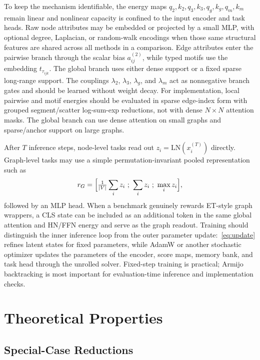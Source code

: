 \documentclass[11pt,a4paper]{article}
\begin{document}
To keep the mechanism identifiable, the energy maps
$q_2,k_2,q_3,k_3,q_g,k_g,q_m,k_m$ remain linear and nonlinear capacity is
confined to the input encoder and task heads. Raw node attributes may be embedded or
projected by a small MLP, with optional degree, Laplacian, or random-walk
encodings when those same structural features are shared across all methods in
a comparison. Edge attributes enter the pairwise branch through the scalar
bias $a^{(2)}_{ij}$, while typed motifs use the embedding $t_{\tau_{ijk}}$.
The global branch uses either dense support or a fixed sparse long-range
support. The couplings $\lambda_2$, $\lambda_3$, $\lambda_g$, and $\lambda_m$
act as nonnegative branch gates and should be learned without weight decay.
For implementation, local pairwise and motif energies should be evaluated in
sparse edge-index form with grouped segment/scatter log-sum-exp reductions,
not with dense $N\times N$ attention masks. The global branch can use dense
attention on small graphs and sparse/anchor support on large graphs.

After $T$ inference steps, node-level tasks read out
$z_i=\mathrm{LN}(x_i^{(T)})$ directly. Graph-level tasks may use a simple
permutation-invariant pooled representation such as
\begin{equation}
  r_G = \Bigl[\tfrac{1}{|V|}\sum_i z_i\ ;\ \sum_i z_i\ ;\ \max_i z_i\Bigr],
\end{equation}
followed by an MLP head. When a benchmark genuinely rewards ET-style graph
wrappers, a CLS state can be included as an additional token in the same global
attention and HN/FFN energy and serve as the graph readout. Training should
distinguish the inner inference loop from the outer parameter
update:~\eqref{eq:update} refines latent states for fixed parameters, while
AdamW or another stochastic optimizer updates the parameters of the encoder,
score maps, memory bank, and task head through the unrolled solver. Fixed-step
training is practical; Armijo backtracking is most important for
evaluation-time inference and implementation checks.

\section{Theoretical Properties}

\subsection{Special-Case Reductions}
\end{document}
